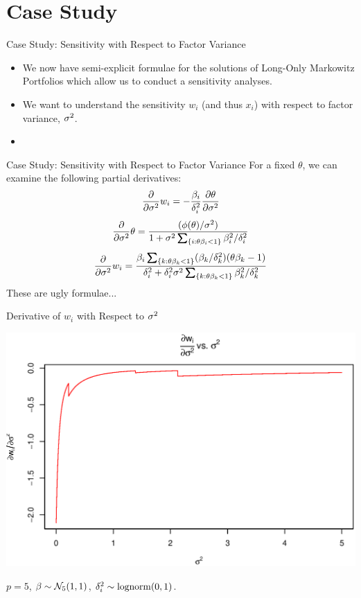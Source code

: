 \documentclass[11pt,leqno]{beamer}
\begin{document}
\section{Case Study}

\begin{frame}{Case Study: Sensitivity with Respect to Factor Variance}
\begin{itemize}
\item We now have semi-explicit formulae for the solutions of Long-Only Markowitz Portfolios which allow us to conduct a sensitivity analyses.
\item We want to understand the sensitivity $w_i$ (and thus $x_i$) with respect to factor variance, $\sigma^2$.
\item {}
\end{itemize}
\end{frame}

\begin{frame}{Case Study: Sensitivity with Respect to Factor Variance}
For a fixed $\theta$, we can examine the following partial derivatives:
\begin{equation}
\frac{\partial }{ \partial {\sigma^2}} w_i  = -\frac{\beta_i}{\delta_i^2}\frac{\partial \theta}{\partial \sigma^2}
\end{equation}
\begin{equation}
\diff {\gs^2} \theta  = \frac{(\phi(\theta)/\gs^2)}{1 + \gs^2 \sum_{\{i:\theta \gb_i <1 \}} \gb_i^2/\gd_i^2}
\end{equation}
\begin{equation}
\diff {\gs^2} w_i  = \frac{\gb_i \sum_{\{k: \theta \gb_k<1\}} (\gb_k/\gd_k^2)(\theta \gb_k-1)}{\gd_i^2 + \gd_i^2 \gs^2 \sum_{\{k:\theta \gb_k <1 \}} \gb_k^2/\gd_k^2}
\end{equation}
These are ugly formulae...
\end{frame}

\begin{frame}{Derivative of $w_i$ with Respect to $\sigma^2$}
\begin{centering}
\includegraphics[scale=.5]{sigma_deriva.eps}
\end{centering}
$p=5$, $\beta \sim \mathcal{N}_5(1,1)$, $\delta_i^2\sim \mathrm{lognorm}(0,1)$.
\end{frame}
\end{document}
